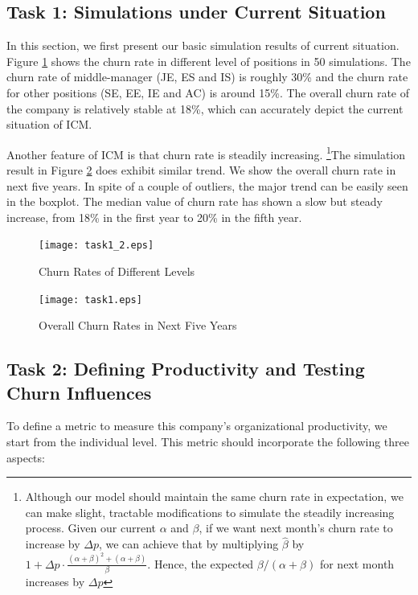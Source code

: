 \documentclass[tcn = 37075, sheet = false, abstract = false]{mcmthesis}
\begin{document}
\subsection{Task 1: Simulations under Current Situation}

In this section, we first present our basic simulation results of current situation. Figure \ref{fig:cdl} shows the churn rate in different level of positions in 50 simulations. The churn rate of middle-manager (JE, ES and IS) is roughly 30\% and the churn rate for other positions (SE, EE, IE and AC) is around 15\%. The overall churn rate of the company is relatively stable at 18\%, which can accurately depict the current situation of ICM.

Another feature of ICM is that churn rate is steadily increasing. \footnote{Although our model should maintain the same churn rate in expectation, we can make slight, tractable modifications to simulate the steadily increasing process. Given our current $\alpha$ and $\beta$, if we want next month's churn rate to increase by $\Delta p$, we can achieve that by multiplying $\hat{\beta}$ by  $1 + \Delta p \cdot \frac{(\alpha+\beta)^2+(\alpha+\beta)}{\beta}$. Hence, the expected $\beta / (\alpha + \beta)$ for next month increases by $\Delta p$}The simulation result in Figure \ref{fig:cnf} does exhibit similar trend. We show the overall churn rate in next five years. In spite of a couple of outliers, the major trend can be easily seen in the boxplot. The median value of churn rate has shown a slow but steady increase, from 18\% in the first year to 20\% in the fifth year.

\begin{figure}[htb!]
\texttt{[image: task1\_2.eps]}
\caption{Churn Rates of Different Levels} 
\label{fig:cdl}
\end{figure}

\begin{figure}[htb!]
\centering
\texttt{[image: task1.eps]}
\caption{Overall Churn Rates in Next Five Years} 
\label{fig:cnf}
\end{figure}

\subsection{Task 2: Defining Productivity and Testing Churn Influences}

To define a metric to measure this company's organizational productivity, we start from the individual level. This metric should incorporate the following three aspects:
\end{document}
